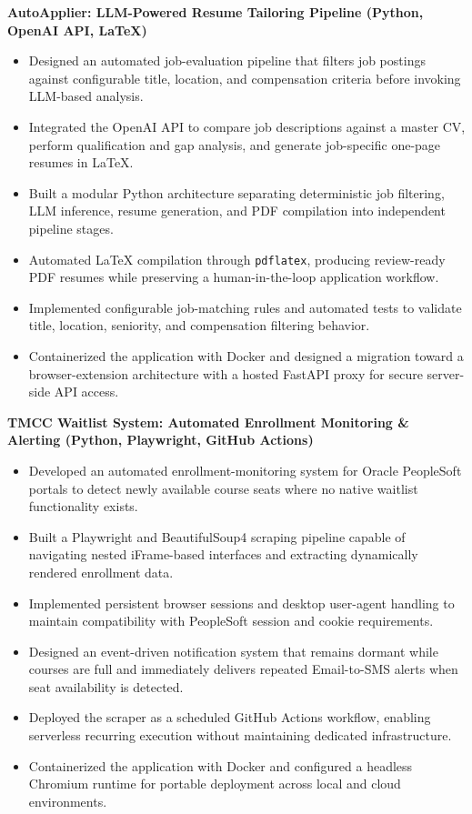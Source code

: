 \documentclass[10pt]{article}
\begin{document}
\textbf{AutoApplier: LLM-Powered Resume Tailoring Pipeline (Python, OpenAI API, LaTeX)} 
    \begin{itemize} 
        \item Designed an automated job-evaluation pipeline that filters job postings against configurable title, location, and compensation criteria before invoking LLM-based analysis. 
        
        \item Integrated the OpenAI API to compare job descriptions against a master CV, perform qualification and gap analysis, and generate job-specific one-page resumes in LaTeX. \item Built a modular Python architecture separating deterministic job filtering, LLM inference, resume generation, and PDF compilation into independent pipeline stages. 
        \item Automated LaTeX compilation through \texttt{pdflatex}, producing review-ready PDF resumes while preserving a human-in-the-loop application workflow. 
        \item Implemented configurable job-matching rules and automated tests to validate title, location, seniority, and compensation filtering behavior. 
        \item Containerized the application with Docker and designed a migration toward a browser-extension architecture with a hosted FastAPI proxy for secure server-side API access. 
    \end{itemize}

\textbf{TMCC Waitlist System: Automated Enrollment Monitoring \& Alerting (Python, Playwright, GitHub Actions)} 
    \begin{itemize} 
        \item Developed an automated enrollment-monitoring system for Oracle PeopleSoft portals to detect newly available course seats where no native waitlist functionality exists. 
        \item Built a Playwright and BeautifulSoup4 scraping pipeline capable of navigating nested iFrame-based interfaces and extracting dynamically rendered enrollment data. 
        \item Implemented persistent browser sessions and desktop user-agent handling to maintain compatibility with PeopleSoft session and cookie requirements. 
        \item Designed an event-driven notification system that remains dormant while courses are full and immediately delivers repeated Email-to-SMS alerts when seat availability is detected. 
        \item Deployed the scraper as a scheduled GitHub Actions workflow, enabling serverless recurring execution without maintaining dedicated infrastructure. 
        \item Containerized the application with Docker and configured a headless Chromium runtime for portable deployment across local and cloud environments.
    \end{itemize}
\end{document}
